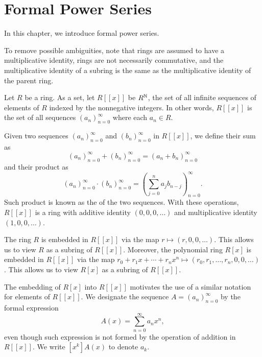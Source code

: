 \chapter{Formal Power Series}

In this chapter, we introduce formal power series.

To remove possible ambiguities,
note that
rings are assumed to have a multiplicative identity,
rings are not necessarily commutative, and
the multiplicative identity of a subring is the same as the multiplicative identity of the parent ring.

Let \(R\) be a ring.
As a set, let \(R[[x]]\) be \(R^{\mathbb{N}}\), the set of all infinite sequences of elements of \(R\) indexed by the nonnegative integers.
In other words, \(R[[x]]\) is the set of all sequences \((a_n)_{n=0}^\infty\) where each \(a_n \in R\).

Given two sequences \((a_n)_{n=0}^\infty\) and \((b_n)_{n=0}^\infty\) in \(R[[x]]\), we define their sum as
\begin{equation}
    (a_n)_{n=0}^\infty + (b_n)_{n=0}^\infty = (a_n + b_n)_{n=0}^\infty
\end{equation}
and their product as
\begin{equation}
    (a_n)_{n=0}^\infty \cdot (b_n)_{n=0}^\infty = \left( \sum_{j=0}^n a_j b_{n-j} \right)_{n=0}^\infty.
\end{equation}
Such product is known as the  of the two sequences.
With these operations, \(R[[x]]\) is a ring with additive identity \((0, 0, 0, \dots)\) and multiplicative identity \((1, 0, 0, \dots)\).

The ring \(R\) is embedded in \(R[[x]]\) via the map \(r \mapsto (r, 0, 0, \dots)\).
This allows us to view \(R\) as a subring of \(R[[x]]\).
Moreover, the polynomial ring \(R[x]\) is embedded in \(R[[x]]\) via the map \(r_0 + r_1 x + \cdots + r_n x^n \mapsto (r_0, r_1, \dots, r_n, 0, 0, \dots)\).
This allows us to view \(R[x]\) as a subring of \(R[[x]]\).

The embedding of \(R[x]\) into \(R[[x]]\) motivates the use of a similar notation for elements of \(R[[x]]\).
We designate the sequence \(A = (a_n)_{n=0}^\infty\) by the formal expression
\begin{equation}
    A(x) = \sum_{n=0}^\infty a_n x^n,
\end{equation}
even though such expression is not formed by the operation of addition in \(R[[x]]\).
We write \([x^k]A(x)\) to denote \(a_k\).

